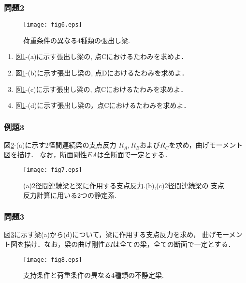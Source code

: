 \documentclass[10pt,a4j]{jarticle}
\begin{document}
\subsubsection{問題2}
\begin{figure}
	\begin{center}
	\texttt{[image: fig6.eps]} 
	\end{center}
	\caption{荷重条件の異なる4種類の張出し梁.} 
	\label{fig:fig2_6}
\end{figure}
\begin{enumerate}
\item
	図\ref{fig:fig2_6}-(a)に示す張出し梁の, 点Cにおけるたわみを求めよ．
\item
	図\ref{fig:fig2_6}-(b)に示す張出し梁の, 点Dにおけるたわみを求めよ．
\item
	図\ref{fig:fig2_6}-(c)に示す張出し梁の, 点Cにおけるたわみを求めよ．
\item
	図\ref{fig:fig2_6}-(d)に示す張出し梁の，点Cにおけるたわみを求めよ．
\end{enumerate}
\subsubsection{例題3}
図\ref{fig:fig2_7}-(a)に示す2径間連続梁の支点反力
$R_A, R_B$および$R_C$を求め，曲げモーメント図を描け．
なお，断面剛性$EA$は全断面で一定とする．
\begin{figure}
	\begin{center}
	\texttt{[image: fig7.eps]} 
	\end{center}
	\caption{(a)2径間連続梁と梁に作用する支点反力.(b),(c)2径間連続梁の
	支点反力計算に用いる2つの静定系.} 
	\label{fig:fig2_7}
\end{figure}
\subsubsection{問題3}
図\ref{fig:fig2_8}に示す梁(a)から(d)について，梁に作用する支点反力を求め，
曲げモーメント図を描け．なお，梁の曲げ剛性$EI$は全ての梁，全ての断面で一定とする．
\begin{figure}
	\begin{center}
	\texttt{[image: fig8.eps]} 
	\end{center}
	\caption{支持条件と荷重条件の異なる4種類の不静定梁.} 
	\label{fig:fig2_8}
\end{figure}
\end{document}
